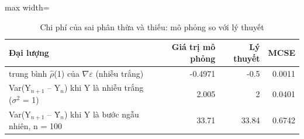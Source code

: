 \begin{table}[H]
\centering\footnotesize
\caption{Chi phí của sai phân thừa và thiếu: mô phỏng so với lý thuyết}\label{tab:tab_b12_03_cost_simulation}
\begin{adjustbox}{max width=\linewidth}
\begin{tabular}{|>{\raggedright\arraybackslash}p{}|r|r|r|}
\toprule
Đại lượng & Giá trị mô phỏng & Lý thuyết & MCSE \\
\midrule
trung bình $\hat{\rho}$(1) của $\nabla\varepsilon$ (nhiễu trắng) & -0.4971 & -0.5 & 0.0011 \\[3pt]
Var(Y$_{n+1}$ – Y$_{n}$) khi Y là nhiễu trắng ($\sigma^{2}$ = 1) & 2.005 & 2 & 0.0401 \\[3pt]
Var(Y$_{n+1}$ – Ȳ$_{n}$) khi Y là bước ngẫu nhiên, n = 100 & 33.71 & 33.84 & 0.6742 \\[3pt]
\bottomrule
\end{tabular}
\end{adjustbox}
\end{table}
